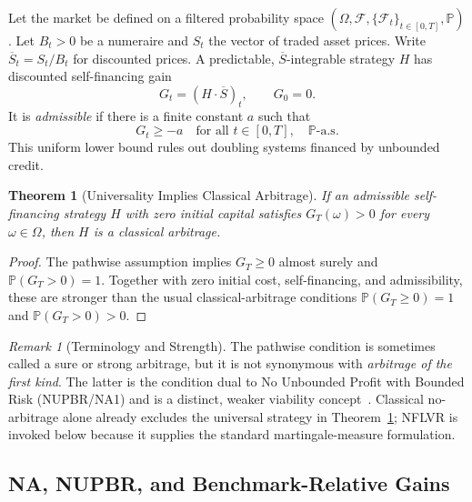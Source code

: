 \documentclass[aps,pra,reprint,superscriptaddress,amsmath,amssymb,floatfix]{revtex4-2}
\theoremstyle{plain}
\newtheorem{theorem}{Theorem}
\theoremstyle{definition}
\theoremstyle{remark}
\newtheorem{remark}{Remark}
\begin{document}
Let the market be defined on a filtered probability space
\((\Omega,\mathcal{F},\{\mathcal{F}_t\}_{t\in[0,T]},\mathbb{P})\).
Let \(B_t>0\) be a numeraire and \(S_t\) the vector of traded asset prices.
Write \(\overline S_t=S_t/B_t\) for discounted prices. A predictable,
\(\overline S\)-integrable strategy \(H\) has discounted self-financing gain
\begin{equation}
  G_t=(H\mathbin{\cdot}\overline S)_t,\qquad G_0=0.
  \label{eq:gain}
\end{equation}
It is \emph{admissible} if there is a finite constant \(a\) such that
\begin{equation}
  G_t\geq -a\quad\text{for all }t\in[0,T],\quad\mathbb{P}\text{-a.s.}
  \label{eq:admissible}
\end{equation}
This uniform lower bound rules out doubling systems financed by unbounded
credit.

\begin{theorem}[Universality Implies Classical Arbitrage]
  \label{thm:arbitrage}
  If an admissible self-financing strategy \(H\) with zero initial capital
  satisfies \(G_T(\omega)>0\) for every \(\omega\in\Omega\), then \(H\) is a
  classical arbitrage.
\end{theorem}

\begin{proof}
The pathwise assumption implies \(G_T\geq0\) almost surely and
\(\mathbb{P}(G_T>0)=1\). Together with zero initial cost, self-financing, and
admissibility, these are stronger than the usual classical-arbitrage
conditions \(\mathbb{P}(G_T\geq0)=1\) and
\(\mathbb{P}(G_T>0)>0\).
\end{proof}

\begin{remark}[Terminology and Strength]
The pathwise condition is sometimes called a sure or strong arbitrage, but it
is not synonymous with \emph{arbitrage of the first kind}. The latter is the
condition dual to No Unbounded Profit with Bounded Risk (NUPBR/NA1) and is a
distinct, weaker viability concept~\cite{Kardaras2012}. Classical
no-arbitrage alone already excludes the universal strategy in
Theorem~\ref{thm:arbitrage}; NFLVR is invoked below because it supplies the
standard martingale-measure formulation.
\end{remark}

\subsection{NA, NUPBR, and Benchmark-Relative Gains}
\end{document}
